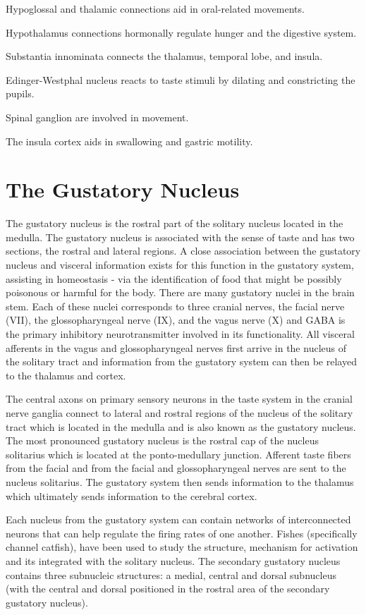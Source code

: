 Hypoglossal and thalamic connections aid in oral-related movements.

Hypothalamus connections hormonally regulate hunger and the digestive system.

Substantia innominata connects the thalamus, temporal lobe, and insula.

Edinger-Westphal nucleus reacts to taste stimuli by dilating and constricting the pupils.

Spinal ganglion are involved in movement.

The insula cortex aids in swallowing and gastric motility.

\hypertarget{the-gustatory-nucleus}{%
\section{The Gustatory Nucleus}\label{the-gustatory-nucleus}}

The gustatory nucleus is the rostral part of the solitary nucleus located in the medulla. The gustatory nucleus is associated with the sense of taste and has two sections, the rostral and lateral regions. A close association between the gustatory nucleus and visceral information exists for this function in the gustatory system, assisting in homeostasis - via the identification of food that might be possibly poisonous or harmful for the body. There are many gustatory nuclei in the brain stem. Each of these nuclei corresponds to three cranial nerves, the facial nerve (VII), the glossopharyngeal nerve (IX), and the vagus nerve (X) and GABA is the primary inhibitory neurotransmitter involved in its functionality. All visceral afferents in the vagus and glossopharyngeal nerves first arrive in the nucleus of the solitary tract and information from the gustatory system can then be relayed to the thalamus and cortex.

The central axons on primary sensory neurons in the taste system in the cranial nerve ganglia connect to lateral and rostral regions of the nucleus of the solitary tract which is located in the medulla and is also known as the gustatory nucleus. The most pronounced gustatory nucleus is the rostral cap of the nucleus solitarius which is located at the ponto-medullary junction. Afferent taste fibers from the facial and from the facial and glossopharyngeal nerves are sent to the nucleus solitarius. The gustatory system then sends information to the thalamus which ultimately sends information to the cerebral cortex.

Each nucleus from the gustatory system can contain networks of interconnected neurons that can help regulate the firing rates of one another. Fishes (specifically channel catfish), have been used to study the structure, mechanism for activation and its integrated with the solitary nucleus. The secondary gustatory nucleus contains three subnucleic structures: a medial, central and dorsal subnucleus (with the central and dorsal positioned in the rostral area of the secondary gustatory nucleus).

